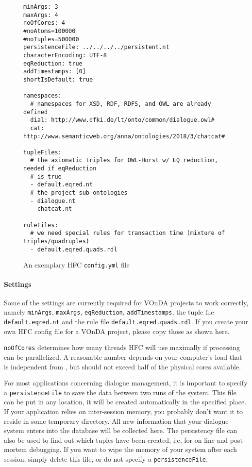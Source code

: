 \begin{figure} [htb]
\small%
\begin{verbatim}
minArgs: 3
maxArgs: 4
noOfCores: 4
#noAtoms=100000
#noTuples=500000
persistenceFile: ../../../../persistent.nt
characterEncoding: UTF-8
eqReduction: true
addTimestamps: [0]
shortIsDefault: true

namespaces:
  # namespaces for XSD, RDF, RDFS, and OWL are already defined
  dial: http://www.dfki.de/lt/onto/common/dialogue.owl#
  cat: http://www.semanticweb.org/anna/ontologies/2018/3/chatcat#

tupleFiles:
  # the axiomatic triples for OWL-Horst w/ EQ reduction, needed if eqReduction
  # is true
  - default.eqred.nt
  # the project sub-ontologies
  - dialogue.nt
  - chatcat.nt

ruleFiles:
  # we need special rules for transaction time (mixture of triples/quadruples)
  - default.eqred.quads.rdl
\end{verbatim}
\caption{An exemplary HFC \texttt{config.yml} file}
\label{fig:hfcconfig}
\end{figure}

\paragraph{Settings}

Some of the settings are currently required for VOnDA projects to work
correctly, namely \texttt{minArgs}, \texttt{maxArgs},
\texttt{eqReduction}, \texttt{addTimestamps}, the tuple file
\texttt{default.eqred.nt} and the rule file
\texttt{default.eqred.quads.rdl}. If you create your own HFC config
file for a VOnDA project, please copy those as shown here.

\texttt{noOfCores} determines how many threads HFC will use maximally
if processing can be parallelized. A reasonable number depends on your
computer's load that is independent from \vonda, but should not exceed
half of the physical cores available.

For most applications concerning dialogue management, it is important to
specify a \texttt{persistenceFile} to save the data between two runs of the
system. This file can be put in any location, it will be created automatically
in the specified place. If your application relies on inter-session memory,
you probably don't want it to reside in some temporary directory. All new
information that your dialogue system enters into the database will be
collected here. The persistency file can also be used to find out which tuples
have been created, i.e, for on-line and post-mortem debugging. If you want to
wipe the memory of your system after each session, simply delete this
file, or do not specify a \texttt{persistenceFile}.


